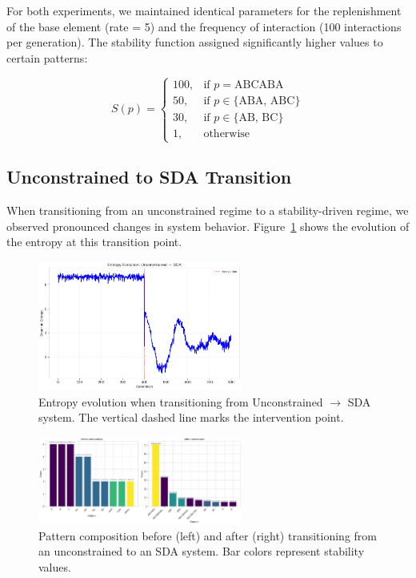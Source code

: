 \documentclass[preprint,12pt]{elsarticle}
\begin{document}
For both experiments, we maintained identical parameters for the replenishment of the base element (rate = 5) and the frequency of interaction (100 interactions per generation). The stability function assigned significantly higher values to certain patterns:

\begin{equation}
S(p) = 
\begin{cases}
100, & \text{if } p = \text{ABCABA} \\
50, & \text{if } p \in \{\text{ABA, ABC}\} \\
30, & \text{if } p \in \{\text{AB, BC}\} \\
1, & \text{otherwise}
\end{cases}
\end{equation}

\subsection{Unconstrained to SDA Transition}

When transitioning from an unconstrained regime to a stability-driven regime, we observed pronounced changes in system behavior. Figure~\ref{fig:u2s-entropy} shows the evolution of the entropy at this transition point.

\begin{figure}[h]
    \centering
    \includegraphics[width=0.6\textwidth]{figure_6.png}
    \caption{Entropy evolution when transitioning from Unconstrained $\to$ SDA system. The vertical dashed line marks the intervention point.}
    \label{fig:u2s-entropy}
\end{figure}


\begin{figure}[h]
    \centering
    \includegraphics[width=0.6\textwidth]{figure_7.png}
    \caption{Pattern composition before (left) and after (right) transitioning from an unconstrained to an SDA system. Bar colors represent stability values.}
    \label{fig:u2s-patterns}
\end{figure}
\end{document}
